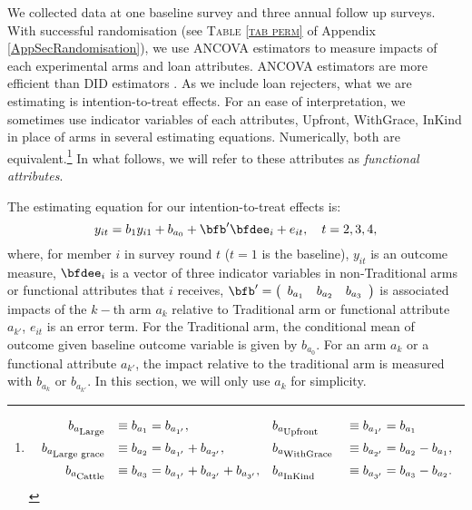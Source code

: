 	We collected data at one baseline survey and three annual follow up surveys. With successful randomisation (see \textsc{\normalsize Table \ref{tab perm}} of Appendix \ref{AppSecRandomisation}), we use ANCOVA estimators to measure impacts of each experimental arms and loan attributes. ANCOVA estimators are more efficient than DID estimators \citep{FrisonPocock1992, McKenzie2012}. As we include loan rejecters, what we are estimating is intention-to-treat effects. For an ease of interpretation, we sometimes use indicator variables of each attributes, \textsf{Upfront, WithGrace, InKind} in place of arms in several estimating equations. Numerically, both are equivalent.\footnote{
\[
\begin{aligned}
b_{a_{\mbox{\scriptsize Large}}}&&\equiv b_{a_{1}}&=b_{a_{1'}}, \quad &&b_{a_{\mbox{\scriptsize Upfront}}}&&\equiv b_{a_{1'}}=b_{a_{1}}\\
b_{a_{\mbox{\scriptsize Large grace}}}&&\equiv b_{a_{2}}&=b_{a_{1'}}+b_{a_{2'}}, &&b_{a_{\mbox{\scriptsize WithGrace}}}&&\equiv b_{a_{2'}}=b_{a_{2}}-b_{a_{1}},\\
b_{a_{\mbox{\scriptsize Cattle}}}&&\equiv b_{a_{3}}&=b_{a_{1'}}+b_{a_{2'}}+b_{a_{3'}}, &&b_{a_{\mbox{\scriptsize InKind}}}&&\equiv b_{a_{3'}}=b_{a_{3}}-b_{a_{2}}.
\end{aligned}
\] } In what follows, we will refer to these attributes as \textit{functional attributes}.
	
	The estimating equation for our intention-to-treat effects is:
	\begin{equation}
	y_{it}=b_{1}y_{i1}+b_{a_{0}}+\bfb'\bfdee_{i}+e_{it}, \quad t=2, 3, 4,
	\label{1steq}
	\end{equation}
	where, for member $i$ in survey round $t$ ($t=1$ is the baseline), $y_{it}$ is an outcome measure, $\bfdee_{i}$ is a vector of three indicator variables in non-\textsf{Traditional} arms or functional attributes that $i$ receives, $\bfb'=\left(
	\begin{array}{ccc}
	b_{a_{1}} & b_{a_{2}} & b_{a_{3}}
	\end{array}
	\right)$ is associated impacts of the $k-$th arm $a_{k}$ relative to \textsf{Traditional} arm or functional attribute $a_{k'}$, $e_{it}$ is an error term. For the \textsf{Traditional} arm, the conditional mean of outcome given baseline outcome variable is given by $b_{a_{0}}$. For an arm $a_{k}$ or a functional attribute $a_{k'}$, the impact relative to the traditional arm is measured with $b_{a_{k}}$ or $b_{a_{k'}}$. In this section, we will only use $a_{k}$ for simplicity.

